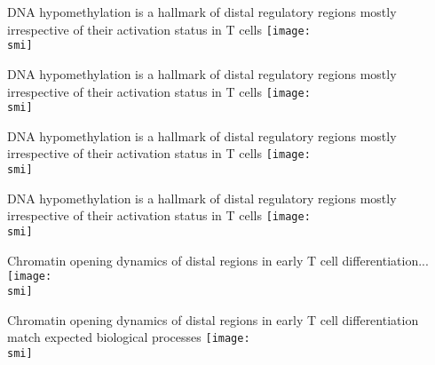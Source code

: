 \documentclass[10pt, usenames, dvipsnames]{beamer}
\def\smi{out/ln/updir/mw-gcthesis-oral/library.bib}
\begin{document}
\begin{frame}{DNA hypomethylation is a hallmark of distal regulatory regions mostly irrespective of their activation status in T cells}
  \def\smi{out/ln/updir/mw-gcthesis-oral/ink/h3k27ac-clusters/4.pdf}
  \texttt{[image: \\smi]}
\end{frame}
\begin{frame}{DNA hypomethylation is a hallmark of distal regulatory regions mostly irrespective of their activation status in T cells}
  \def\smi{out/ln/updir/mw-gcthesis-oral/ink/h3k27ac-clusters/5.pdf}
  \texttt{[image: \\smi]}
\end{frame}
\begin{frame}{DNA hypomethylation is a hallmark of distal regulatory regions mostly irrespective of their activation status in T cells}
  \def\smi{out/ln/updir/mw-gcthesis-oral/ink/chromatin-states/genome-view/enhancers/repressed.pdf}
  \texttt{[image: \\smi]}
\end{frame}
\begin{frame}{DNA hypomethylation is a hallmark of distal regulatory regions mostly irrespective of their activation status in T cells}
  \def\smi{out/ln/updir/mw-gcthesis-oral/ink/chromatin-states/genome-view/enhancers/repressed-activated.pdf}
  \texttt{[image: \\smi]}
\end{frame}
\begin{frame}{Chromatin opening dynamics of distal regions in early T cell differentiation...}
  \def\smi{out/ln/updir/mw-gcthesis-oral/ink/atac-clusters/atac.pdf}
  \texttt{[image: \\smi]}
\end{frame}
\begin{frame}{Chromatin opening dynamics of distal regions in early T cell differentiation match expected biological processes} 
  \def\smi{out/ln/updir/mw-gcthesis-oral/ink/atac-clusters/atac-gobp.pdf}
  \texttt{[image: \\smi]}
\end{frame}
\end{document}
